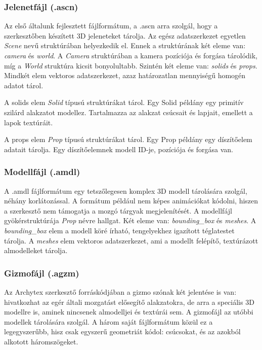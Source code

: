 \subsubsection{Jelenetfájl (.ascn)}

Az első általunk fejlesztett fájlformátum, a .ascn arra szolgál, hogy a szerkesztőben készített
3D jeleneteket tárolja. Az egész adatszerkezet egyetlen \emph{Scene} nevű struktúrában helyezkedik
el. Ennek a struktúrának két eleme van: \emph{camera} és \emph{world}. A \emph{Camera} struktúrában
a kamera pozíciója és forgása tárolódik, míg a \emph{World} struktúra kicsit bonyolultabb. Szintén
két eleme van: \emph{solids} és \emph{props}. Mindkét elem vektoros adatszerkezet, azaz
határozatlan mennyiségű homogén adatot tárol.

A solids elem \emph{Solid} típusú struktúrákat tárol. Egy Solid példány egy primitív szilárd
alakzatot modellez. Tartalmazza az alakzat csúcsait és lapjait, emellett a lapok textúráit.

A props elem \emph{Prop} típusú struktúrákat tárol. Egy Prop példány egy díszítőelem adatait
tárolja. Egy díszítőelemnek modell ID-je, pozíciója és forgása van.

\subsubsection{Modellfájl (.amdl)}

A .amdl fájlformátum egy tetszőlegesen komplex 3D modell tárolására szolgál, néhány korlátozással. A formátum például nem képes animációkat kódolni, hiszen a szerkesztő nem támogatja a mozgó tárgyak megjelenítését. A modellfájl gyökérstruktúrája \emph{Prop} névre hallgat. Két eleme van: \emph{bounding\_box} és \emph{meshes}. A \emph{bounding\_box} elem a modell köré írható, tengelyekhez igazított téglatestet tárolja. A \emph{meshes} elem vektoros adatszerkezet, ami a modellt felépítő, textúrázott almodelleket tárolja.

\subsubsection{Gizmofájl (.agzm)}

Az Archytex szerkesztő forráskódjában a gizmo szónak két jelentése is van: hivatkozhat az egér
általi mozgatást elősegítő alakzatokra, de arra a speciális 3D modellre is, aminek nincsenek
almodelljei és textúrái sem. A gizmofájl az utóbbi modellek tárolására szolgál. A három saját
fájlformátum közül ez a legegyszerűbb, hisz csak egyszerű geometriát kódol: csúcsokat, és az
azokból alkotott háromszögeket.